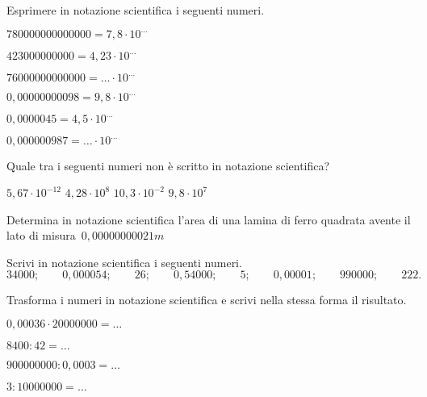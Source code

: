\subsubsection*{}

\begin{esercizio}
 \label{ese:3.61}
Esprimere in notazione scientifica i seguenti numeri.
\begin{multicols}{2}
\begin{enumeratea}
\item $780000000000000=7,8\cdot10^{\ldots}$
\item $423000000000=4,23\cdot10^{\ldots}$
\item $76000000000000= \ldots \cdot 10^{\ldots}$
\item $0,00000000098=9,8\cdot10^{\ldots}$
\item $0,0000045=4,5\cdot10^{\ldots}$
\item $0,000000987= \ldots \cdot 10^{\ldots}$
\end{enumeratea}
\end{multicols}
\end{esercizio}

\begin{esercizio}
 \label{ese:3.62}
Quale tra i seguenti numeri non è scritto in notazione scientifica?

\boxA\quad$5,67\cdot 10^{-12}$\qquad
\boxB\quad$4,28\cdot 10^8$\qquad
\boxC\quad$10,3\cdot 10^{-2}$\qquad
\boxD\quad$9,8\cdot 10^7$\qquad
\end{esercizio}

\begin{esercizio}
 \label{ese:3.63}
Determina in notazione scientifica l'area di una lamina di ferro quadrata
avente il lato di misura~$0,00000000021\unit{m}$
\end{esercizio}

\begin{esercizio}
 \label{ese:3.64}
Scrivi in notazione scientifica i seguenti numeri.
\[34000;\qquad0,000054;\qquad26;\qquad0,54000;\qquad5;\qquad0,00001;
\qquad990000;\qquad222.\]
\end{esercizio}

\begin{esercizio}
 \label{ese:3.65}
Trasforma i numeri in notazione scientifica e scrivi nella stessa forma il 
risultato.
\begin{multicols}{2}
\begin{enumeratea}
\item $0,00036\cdot20000000=\ldots$
\item $8400:42=\ldots$
\item $900000000:0,0003=\ldots$
\item $3:10000000=\ldots$
\end{enumeratea}
\end{multicols}
\end{esercizio}

